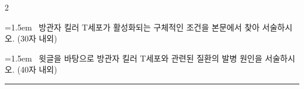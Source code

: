 \documentclass[10pt, a4paper]{article}
\begin{document}
\begin{multicols}{2}
\noindent\begin{minipage}{\columnwidth}
\vspace{2mm}
{\hangindent=1.5em  ~방관자 킬러 T세포가 활성화되는 구체적인 조건을 본문에서 찾아 서술하시오. (30자 내외)\par}

\vspace{3mm}
\noindent\hrulefill
\vspace{2.5mm}
\noindent\hrulefill
\vspace{2.5mm}
\noindent\hrulefill
\vspace{2.5mm}
\noindent\hrulefill
\vspace{2.5mm}
\noindent\hrulefill
\vspace{2.5mm}
\vspace{1mm}
\vspace{4mm}
\end{minipage}
\par

\noindent\begin{minipage}{\columnwidth}
\vspace{2mm}
{\hangindent=1.5em  ~윗글을 바탕으로 방관자 킬러 T세포와 관련된 질환의 발병 원인을 서술하시오. (40자 내외)\par}

\vspace{3mm}
\noindent\hrulefill
\vspace{2.5mm}
\noindent\hrulefill
\vspace{2.5mm}
\noindent\hrulefill
\vspace{2.5mm}
\noindent\hrulefill
\vspace{2.5mm}
\noindent\hrulefill
\vspace{2.5mm}
\vspace{1mm}
\vspace{4mm}
\end{minipage}
\par

\end{multicols}
\newpage

\vspace{3mm}
\noindent\rule{\textwidth}{0.8pt}
\vspace{3mm}

\vspace{2mm}
\end{document}
